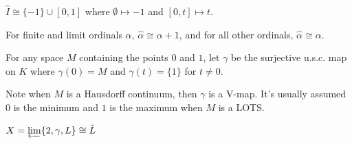 \documentclass[11pt]{article}
\begin{document}
  \begin{example}
    \(\hat I\cong\{-1\}\cup [0,1]\) where
    \(\emptyset\mapsto-1\) and \([0,t]\mapsto t\).
  \end{example}

  \begin{example}
    For finite and limit ordinals \(\alpha\), \(\hat \alpha\cong \alpha+1\),
    and for all other ordinals, \(\hat\alpha\cong\alpha\).
  \end{example}

  \begin{definition}
    For any space \(M\) containing the points \(0\) and \(1\),
    let \(\gamma\) be the surjective u.s.c. map on \(K\) where
    \(\gamma(0)=M\) and \(\gamma(t)=\{1\}\)
    for \(t\not=0\).
  \end{definition}

  Note when \(M\) is a Hausdorff continuum, then \(\gamma\) is a V-map.
  It's usually assumed \(0\) is the minimum and \(1\) is the maximum
  when \(M\) is a LOTS.

  \begin{theorem}
    \(X=\varprojlim \{2, \gamma, L\}\cong \check L\)
  \end{theorem}
\end{document}
